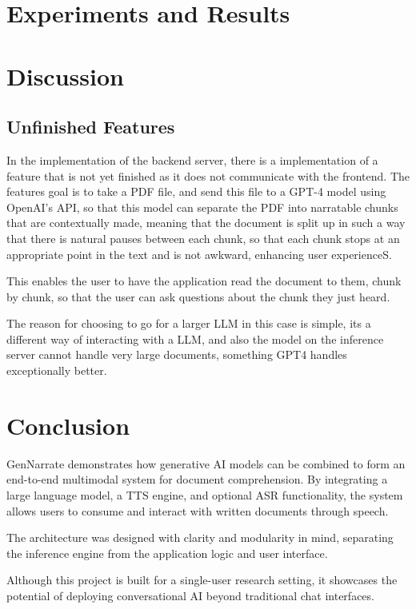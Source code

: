 \documentclass[twocolumn]{article}
\begin{document}
\section{Experiments and Results}

\section{Discussion}

\subsection{Unfinished Features}
In the implementation of the backend server, there is a implementation of a feature that is not yet finished as it does not communicate with the frontend. The features goal is to take a PDF file, and send this file to a GPT-4 model using OpenAI's API, so that this model can separate the PDF into narratable chunks that are contextually made, meaning that the document is split up in such a way that there is natural pauses between each chunk, so that each chunk stops at an appropriate point in the text and is not awkward, enhancing user experienceS.

This enables the user to have the application read the document to them, chunk by chunk, so that the user can ask questions about the chunk they just heard. 

The reason for choosing to go for a larger LLM in this case is simple, its a different way of interacting with a LLM, and also the model on the inference server cannot handle very large documents, something GPT4 handles exceptionally better.

\section{Conclusion}
GenNarrate demonstrates how generative AI models can be combined to form an end-to-end multimodal system for document comprehension. By integrating a large language model, a TTS engine, and optional ASR functionality, the system allows users to consume and interact with written documents through speech.

The architecture was designed with clarity and modularity in mind, separating the inference engine from the application logic and user interface.

Although this project is built for a single-user research setting, it showcases the potential of deploying conversational AI beyond traditional chat interfaces.

\subsubsection{}


\end{document}
